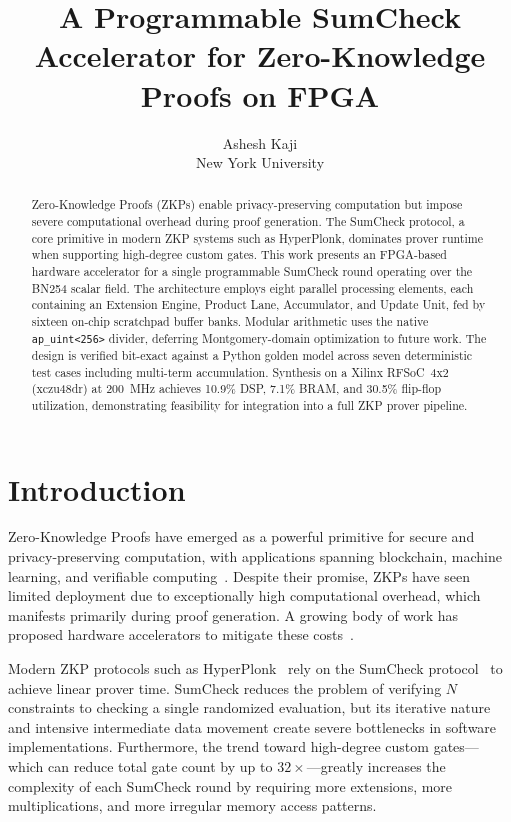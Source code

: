 \documentclass[conference]{IEEEtran}
\title{A Programmable SumCheck Accelerator for Zero-Knowledge Proofs on FPGA}
\author{Ashesh Kaji\\New York University}
\begin{document}
\maketitle

\begin{abstract}
Zero-Knowledge Proofs (ZKPs) enable privacy-preserving computation but impose severe computational overhead during proof generation. The SumCheck protocol, a core primitive in modern ZKP systems such as HyperPlonk, dominates prover runtime when supporting high-degree custom gates. This work presents an FPGA-based hardware accelerator for a single programmable SumCheck round operating over the BN254 scalar field. The architecture employs eight parallel processing elements, each containing an Extension Engine, Product Lane, Accumulator, and Update Unit, fed by sixteen on-chip scratchpad buffer banks. Modular arithmetic uses the native \texttt{ap\_uint<256>} divider, deferring Montgomery-domain optimization to future work. The design is verified bit-exact against a Python golden model across seven deterministic test cases including multi-term accumulation. Synthesis on a Xilinx RFSoC~4x2 (xczu48dr) at 200~MHz achieves 10.9\% DSP, 7.1\% BRAM, and 30.5\% flip-flop utilization, demonstrating feasibility for integration into a full ZKP prover pipeline.
\end{abstract}

\section{Introduction}

Zero-Knowledge Proofs have emerged as a powerful primitive for secure and privacy-preserving computation, with applications spanning blockchain, machine learning, and verifiable computing~\cite{setty2020spartan}. Despite their promise, ZKPs have seen limited deployment due to exceptionally high computational overhead, which manifests primarily during proof generation. A growing body of work has proposed hardware accelerators to mitigate these costs~\cite{zkphire2026}.

Modern ZKP protocols such as HyperPlonk~\cite{chen2022hyperplonk} rely on the SumCheck protocol~\cite{lund1992algebraic} to achieve linear prover time. SumCheck reduces the problem of verifying $N$ constraints to checking a single randomized evaluation, but its iterative nature and intensive intermediate data movement create severe bottlenecks in software implementations. Furthermore, the trend toward high-degree custom gates---which can reduce total gate count by up to $32\times$---greatly increases the complexity of each SumCheck round by requiring more extensions, more multiplications, and more irregular memory access patterns.
\end{document}
